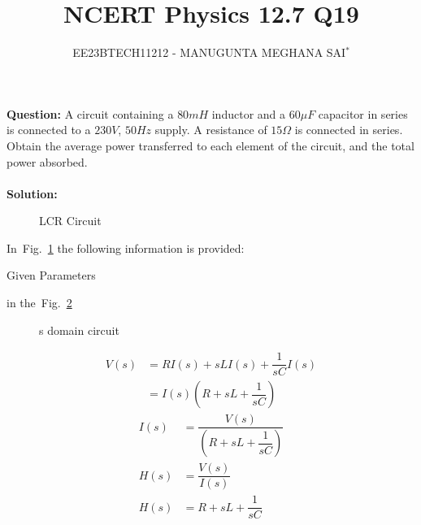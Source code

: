 \documentclass[journal,12pt,onecolumn]{IEEEtran}
\title{
	
\title{NCERT Physics 12.7 Q19}
\author{EE23BTECH11212 - MANUGUNTA MEGHANA SAI$^{*}$%
}


}
\newcommand\figref{Fig.~\ref}
\theoremstyle{remark}
\begin{document}
\maketitle

\textbf{Question:} 
A circuit containing a $80 mH$ inductor and a $60 \mu F$ capacitor in series is connected to a $230 V$, $50 Hz$ supply. A resistance of $15 \Omega $ is connected in series. Obtain the average power transferred to each element of the circuit, and the total power absorbed.\\
\\

\textbf{Solution: }
\begin{figure}[h]
	\centering
	
	\caption{LCR Circuit}
	\label{fig:msm11.7.19fig2}
\end{figure}
     
In~\figref{fig:msm11.7.19fig2} the following information is provided:
 
 

 \begin{table}[h!]
 	\centering
 	\resizebox{6 cm}{!}{
 		
 	}
 	\caption{Given Parameters}
 	\label{tab:msm11.7.19tab1} 
 \end{table} 
  in the~\figref{fig:msm11.7.19fig1}
 
 \begin{figure}[!h]
 	\centering
 	
 	\caption{s domain circuit}
 	\label{fig:msm11.7.19fig1}
 	
 \end{figure}
 \begin{align}
 	V(s) &= R I(s) + sL I(s) + \dfrac{1}{sC} I(s)\\
         &= I(s)\left(R + sL + \dfrac{1}{sC}\right)
 \end{align}
\begin{align}
    I(s) &= \dfrac{V(s)}{\left(R + sL + \dfrac{1}{sC}\right)}\\ 
    H(s) &= \dfrac{V(s)}{I(s)}\\
	H(s) &= R + sL + \dfrac{1}{sC}
\end{align}
\end{document}
